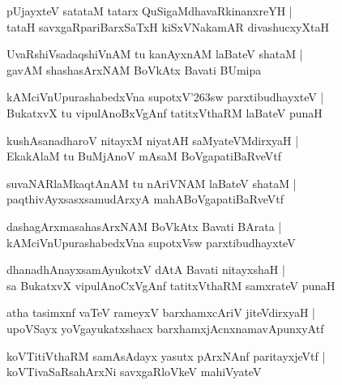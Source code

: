 \documentclass[twoside,12pt,openright]{book}
\def\S{\char'263}
\newcounter{shloka}[chapter]
\begin{document}
\begin{shloka}
pUjayxteV satataM tatarx QuSigaMdhavaRkinanxreYH |\\
tataH savxgaRpariBarxSaTxH kiSxVNakamAR divashucxyXtaH 
\end{shloka}

\begin{shloka}
UvaRshiVsadaqshiVnAM tu kanAyxnAM laBateV shataM |\\
gavAM shashasArxNAM BoVkAtx Bavati BUmipa 
\end{shloka}

\begin{shloka}
kAMciVnUpurashabedxVna supotxV\S sw parxtibudhayxteV |\\
BukatxvX tu vipulAnoBxVgAnf tatitxVthaRM laBateV punaH 
\end{shloka}

\begin{shloka}
kushAsanadharoV nitayxM niyatAH saMyateVMdirxyaH |\\
EkakAlaM tu BuMjAnoV mAsaM BoVgapatiBaRveVtf 
\end{shloka}

\begin{shloka}
suvaNARlaMkaqtAnAM tu nAriVNAM laBateV shataM |\\
paqthivAyxsasxsamudArxyA mahABoVgapatiBaRveVtf 
\end{shloka}

\begin{shloka}
dashagArxmasahasArxNAM BoVkAtx Bavati BArata |\\
kAMciVnUpurashabedxVna supotxVsw parxtibudhayxteV 
\end{shloka}

\begin{shloka}
dhanadhAnayxsamAyukotxV dAtA Bavati nitayxshaH |\\
sa BukatxvX vipulAnoCxVgAnf tatitxVthaRM samxrateV punaH 
\end{shloka}

\begin{shloka}
atha tasimxnf vaTeV rameyxV barxhamxcAriV jiteVdirxyaH |\\
upoVSayx yoVgayukatxshacx barxhamxjAcnxnamavApunxyAtf 
\end{shloka}

\begin{shloka}
koVTitiVthaRM samAsAdayx yasutx pArxNAnf paritayxjeVtf |\\
koVTivaSaRsahArxNi savxgaRloVkeV mahiVyateV 
\end{shloka}
\end{document}

